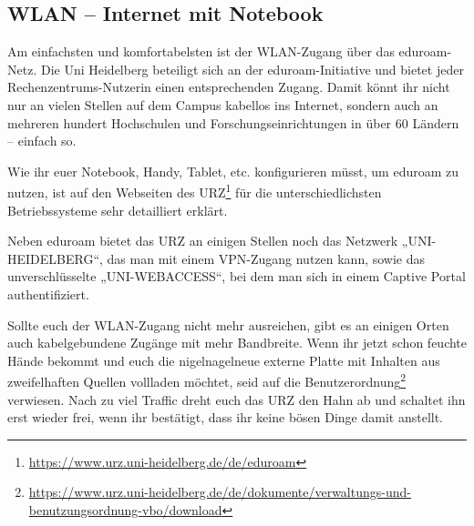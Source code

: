 \subsection{WLAN -- Internet mit Notebook}

\begin{figure}[h]
    \centering
    \vspace{-5mm}

    \vspace{-5mm}

\end{figure}



Am einfachsten und komfortabelsten ist der WLAN-Zugang über das e\-du\-roam-Netz. Die Uni Heidelberg beteiligt sich an der eduroam-Initiative und bietet jeder Rechenzentrums-Nutzerin einen entsprechenden Zugang. Damit könnt ihr nicht nur an vielen Stellen auf dem Campus kabellos ins Internet, sondern auch an mehreren hundert Hochschulen und Forschungseinrichtungen in über 60 Ländern – einfach so.

Wie ihr euer Notebook, Handy, Tablet, etc. konfigurieren müsst, um eduroam zu nutzen, ist auf den Webseiten des URZ\footnote{\url{https://www.urz.uni-heidelberg.de/de/eduroam}} für die unterschiedlichsten Betriebssysteme sehr detailliert erklärt.

Neben eduroam bietet das URZ an einigen Stellen noch das Netzwerk „UNI-HEIDELBERG“, das man mit einem VPN-Zugang nutzen kann, sowie das unverschlüsselte „UNI-WEBACCESS“, bei dem man sich in einem Captive Portal authentifiziert.

Sollte euch der WLAN-Zugang nicht mehr ausreichen, gibt es an einigen Orten auch kabelgebundene Zugänge mit mehr Bandbreite. Wenn ihr jetzt schon feuchte Hände bekommt und euch die nigelnagelneue externe Platte mit Inhalten aus zweifelhaften Quellen vollladen möchtet, seid auf die Benutzerordnung\footnote{\url{https://www.urz.uni-heidelberg.de/de/dokumente/verwaltungs-und-benutzungsordnung-vbo/download}} verwiesen. Nach zu viel Traffic dreht euch das \gls{URZ} den Hahn ab und schaltet ihn erst wieder frei, wenn ihr bestätigt, dass ihr keine bösen Dinge damit anstellt.

